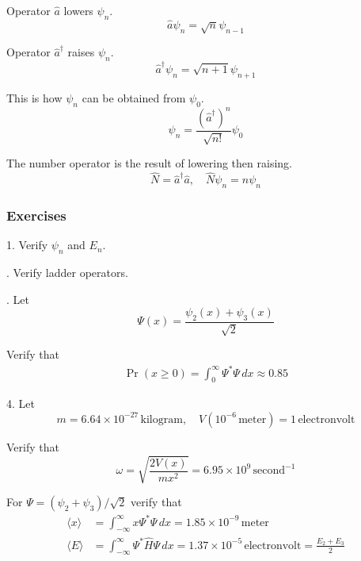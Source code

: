 Operator $\hat a$ lowers $\psi_n$.
\begin{equation*}
\hat a\psi_n=\sqrt n\psi_{n-1}
\end{equation*}

Operator $\hat a^\dag$ raises $\psi_n$.
\begin{equation*}
\hat a^\dag\psi_n=\sqrt{n+1}\psi_{n+1}
\end{equation*}

This is how $\psi_n$ can be obtained from $\psi_0$.
\begin{equation*}
\psi_n=\frac{(\hat a^\dag)^n}{\sqrt{n!}}\psi_0
\end{equation*}

The number operator is the result of lowering then raising.
\begin{equation*}
\hat N=\hat a^\dag\hat a,\quad\hat N\psi_n=n\psi_n
\end{equation*}

\subsubsection*{Exercises}

1. Verify $\psi_n$ and $E_n$.

. Verify ladder operators.

. Let
\begin{equation*}
\Psi(x)=\frac{\psi_2(x)+\psi_3(x)}{\sqrt2}
\end{equation*}

Verify that
\begin{align*}
\Pr(x\ge0)=\int_0^\infty \Psi^*\Psi\,dx\approx0.85
\end{align*}

4. Let
\begin{equation*}
m=6.64\times10^{-27}\,\text{kilogram},\quad
V(10^{-6}\,\text{meter})=1\,\text{electronvolt}
\end{equation*}

Verify that
\begin{equation*}
\omega=\sqrt{\frac{2V(x)}{mx^2}}=6.95\times10^9\,\text{second}^{-1}
\end{equation*}

For $\Psi=(\psi_2+\psi_3)/\sqrt2$ verify that
\begin{align*}
\langle x\rangle&=\int_{-\infty}^\infty x\Psi^*\Psi\,dx=1.85\times10^{-9}\,\text{meter}
\\
\langle E\rangle&=\int_{-\infty}^\infty \Psi^*\hat H\Psi\,dx=1.37\times10^{-5}\,\text{electronvolt}
=\frac{E_2+E_3}{2}
\end{align*}


